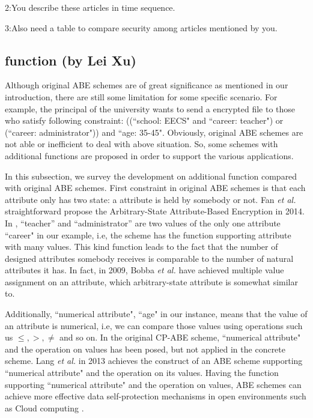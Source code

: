 2:You describe these articles in time sequence.

3:Also need a table to compare security among articles mentioned by you.

\subsection{function (by Lei Xu)}
Although original ABE schemes are of great significance as mentioned in our introduction,
there are still some limitation for some specific scenario.
For example, the principal of the university wants to send a encrypted file to those who satisfy following constraint:
((``school: EECS" and ``career: teacher") or (``career: administrator")) and ``age: 35-45".
Obviously, original ABE schemes are not able or inefficient to deal with above situation.
So, some schemes with additional functions are proposed in order to support the various applications.

In this subsection, we survey the development on additional function compared with original ABE schemes.
First constraint in original ABE schemes is that each attribute only has two state: a attribute is held by somebody or not.
Fan \emph{et al.} \cite{Fan:TOC'14} straightforward propose the Arbitrary-State Attribute-Based Encryption in 2014.
In \cite{Fan:TOC'14}, ``teacher'' and ``administrator'' are two values of the only one attribute ``career" in our example,
i.e, the scheme has the function supporting attribute with many values.
This kind function leads to the fact that the number of designed attributes somebody receives is comparable to the number of natural attributes it has.
In fact, in 2009,
Bobba \emph{et al.} \cite{Bobba:ESORICS'09} have achieved multiple value assignment on an attribute, which arbitrary-state attribute is somewhat similar to.

Additionally, ``numerical attribute", ``age" in our instance, means that the value of an attribute is numerical, i.e,
we can compare those values using operations such us $\leq, >, \neq$ and so on.
In the original CP-ABE scheme\cite{Bethencourt:SP'07}, ``numerical attribute" and the operation on values has been posed,
but not applied in the concrete scheme.
Lang \emph{et al.} \cite{Lang:SC'13} in 2013 achieves the construct of an ABE scheme supporting ``numerical attribute" and the operation on its values.
Having the function supporting ``numerical attribute" and the operation on values, ABE schemes can achieve more
effective data self-protection mechanisms in open environments such as Cloud computing \cite{Lang:SC'13}.

